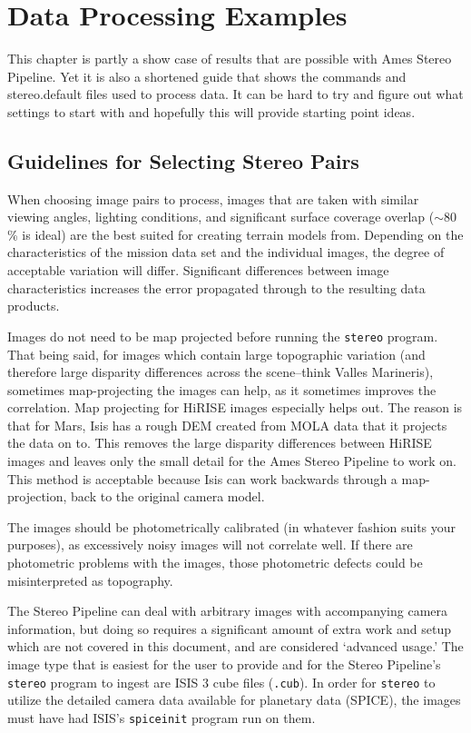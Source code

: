 \chapter{Data Processing Examples}

This chapter is partly a show case of results that are possible with
Ames Stereo Pipeline. Yet it is also a shortened guide that shows the
commands and stereo.default files used to process data. It can be hard
to try and figure out what settings to start with and hopefully this will
provide starting point ideas.

\section{Guidelines for Selecting Stereo Pairs}

When choosing image pairs to process, images that are taken with
similar viewing angles, lighting conditions, and significant surface
coverage overlap ($\sim80$\% is ideal) are the best suited for
creating terrain models from. Depending on the characteristics of
the mission data set and the individual images, the degree of
acceptable variation will differ. Significant differences between
image characteristics increases the error propagated through to the
resulting data products.

Images do not need to be map projected before running the
\texttt{stereo} program. That being said, for images which contain
large topographic variation (and therefore large disparity differences
across the scene--think Valles Marineris), sometimes map-projecting
the images can help, as it sometimes improves the correlation. Map
projecting for HiRISE images especially helps out. The reason is that
for Mars, Isis has a rough DEM created from MOLA data that it projects the
data on to. This removes the large disparity differences between
HiRISE images and leaves only the small detail for the Ames Stereo
Pipeline to work on. This method is acceptable because Isis can work
backwards through a map-projection, back to the original camera model.

The images should be photometrically calibrated (in whatever fashion
suits your purposes), as excessively noisy images will not correlate
well. If there are photometric problems with the images, those
photometric defects could be misinterpreted as topography.

The Stereo Pipeline can deal with arbitrary images with accompanying
camera information, but doing so requires a significant amount of
extra work and setup which are not covered in this document, and
are considered `advanced usage.'  The image type that is easiest
for the user to provide and for the Stereo Pipeline's \texttt{stereo}
program to ingest are ISIS 3 cube files (\texttt{.cub}).  In order
for \texttt{stereo} to utilize the detailed camera data available
for planetary data (SPICE), the images must have had ISIS's
\texttt{spiceinit} program run on them.

